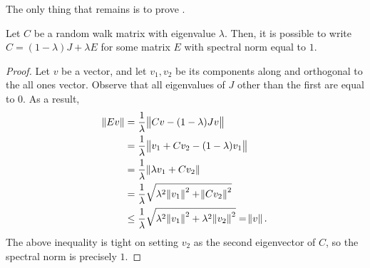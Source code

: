 			The only thing that remains is to prove .

			\begin{lemma}
				\label{lem: error of walk from complete}
				Let $C$ be a random walk matrix with eigenvalue $\lambda$. Then, it is possible to write $C = (1-\lambda)J + \lambda E$ for some matrix $E$ with spectral norm%
				equal to $1$.
			\end{lemma}
			\begin{proof}
				Let $v$ be a vector, and let $v_1,v_2$ be its components along and orthogonal to the all ones vector. Observe that all eigenvalues of $J$ other than the first are equal to $0$. As a result,
				\begin{align*}
					\norm{Ev} &= \frac{1}{\lambda} \norm{Cv - (1-\lambda)Jv} \\
						&= \frac{1}{\lambda} \norm{v_1 + Cv_2 - (1-\lambda)v_1} \\
						&= \frac{1}{\lambda} \norm{\lambda v_1 + Cv_2} \\
						&= \frac{1}{\lambda} \sqrt{\lambda^2 \norm{v_1}^2 + \norm{Cv_2}^2} \\
						&\le  \frac{1}{\lambda} \sqrt{\lambda^2 \norm{v_1}^2 + \lambda^2 \norm{v_2}^2} = \norm{v}.
				\end{align*}
				The above inequality is tight on setting $v_2$ as the second eigenvector of $C$, so the spectral norm is precisely $1$.
			\end{proof}

